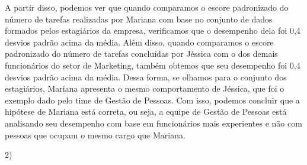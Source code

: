 \documentclass[12pt]{article}
\begin{document}
\begin{enumerate}[a)]
A partir disso, podemos ver que quando comparamos o escore padronizado do número de tarefas realizadas por Mariana com base no conjunto de dados formados pelos estagiários da empresa, verificamos
que o desempenho dela foi 0,4 desvios padrão acima da média. Além disso, quando comparamos o escore padronizado do número de tarefas concluídas por
Jéssica com o dos demais funcionários do setor de Marketing, também obtemos que seu desempenho foi 0,4 desvios padrão acima da média. Dessa forma, 
se olhamos para o conjunto dos estagiários, Mariana apresenta o mesmo comportamento de Jéssica, que foi o exemplo dado pelo time de Gestão de Pessoas. Com isso,
podemos concluir que a hipótese de Mariana está correta, ou seja, a equipe de Gestão de Pessoas está analisando seu desempenho com base em funcionários 
mais experientes e não com pessoas que ocupam o mesmo cargo que Mariana. 
\end{enumerate}

2) 
\end{document}
